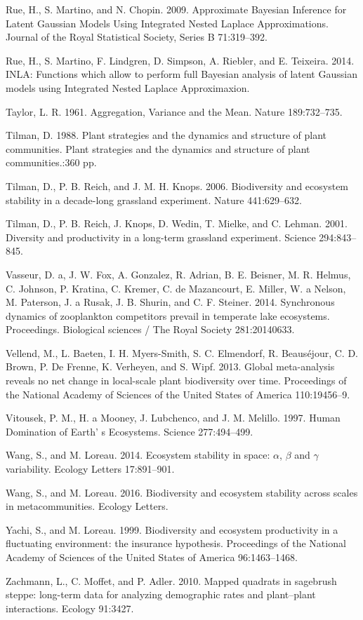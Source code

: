 \documentclass[12pt,]{article}
\begin{document}
Rue, H., S. Martino, and N. Chopin. 2009. Approximate Bayesian Inference
for Latent Gaussian Models Using Integrated Nested Laplace
Approximations. Journal of the Royal Statistical Society, Series B
71:319--392.

Rue, H., S. Martino, F. Lindgren, D. Simpson, A. Riebler, and E.
Teixeira. 2014. INLA: Functions which allow to perform full Bayesian
analysis of latent Gaussian models using Integrated Nested Laplace
Approximaxion.

Taylor, L. R. 1961. Aggregation, Variance and the Mean. Nature
189:732--735.

Tilman, D. 1988. Plant strategies and the dynamics and structure of
plant communities. Plant strategies and the dynamics and structure of
plant communities.:360 pp.

Tilman, D., P. B. Reich, and J. M. H. Knops. 2006. Biodiversity and
ecosystem stability in a decade-long grassland experiment. Nature
441:629--632.

Tilman, D., P. B. Reich, J. Knops, D. Wedin, T. Mielke, and C. Lehman.
2001. Diversity and productivity in a long-term grassland experiment.
Science 294:843--845.

Vasseur, D. a, J. W. Fox, A. Gonzalez, R. Adrian, B. E. Beisner, M. R.
Helmus, C. Johnson, P. Kratina, C. Kremer, C. de Mazancourt, E. Miller,
W. a Nelson, M. Paterson, J. a Rusak, J. B. Shurin, and C. F. Steiner.
2014. Synchronous dynamics of zooplankton competitors prevail in
temperate lake ecosystems. Proceedings. Biological sciences / The Royal
Society 281:20140633.

Vellend, M., L. Baeten, I. H. Myers-Smith, S. C. Elmendorf, R.
Beaus{é}jour, C. D. Brown, P. {De Frenne}, K. Verheyen, and S. Wipf.
2013. Global meta-analysis reveals no net change in local-scale plant
biodiversity over time. Proceedings of the National Academy of Sciences
of the United States of America 110:19456--9.

Vitousek, P. M., H. a Mooney, J. Lubchenco, and J. M. Melillo. 1997.
Human Domination of Earth' s Ecosystems. Science 277:494--499.

Wang, S., and M. Loreau. 2014. Ecosystem stability in space: \(\alpha\),
\(\beta\) and \(\gamma\) variability. Ecology Letters 17:891--901.

Wang, S., and M. Loreau. 2016. Biodiversity and ecosystem stability
across scales in metacommunities. Ecology Letters.

Yachi, S., and M. Loreau. 1999. Biodiversity and ecosystem productivity
in a fluctuating environment: the insurance hypothesis. Proceedings of
the National Academy of Sciences of the United States of America
96:1463--1468.

Zachmann, L., C. Moffet, and P. Adler. 2010. Mapped quadrats in
sagebrush steppe: long-term data for analyzing demographic rates and
plant--plant interactions. Ecology 91:3427.
\end{document}

